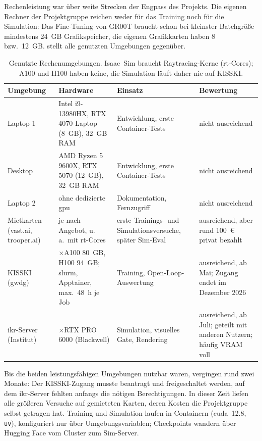 Rechenleistung war über weite Strecken der Engpass des Projekts. Die eigenen Rechner der
Projektgruppe reichen weder für das Training noch für die Simulation: Das Fine-Tuning von
GR00T braucht schon bei kleinster Batchgröße mindestens 24~GB Grafikspeicher, die eigenen
Grafikkarten haben 8 bzw.\ 12~GB.  stellt alle genutzten Umgebungen
gegenüber.

\begin{table}[htb]
  \centering
  \small
  \begin{tabularx}{\linewidth}{>{\raggedright\arraybackslash}p{2.6cm}>{\raggedright\arraybackslash}X>{\raggedright\arraybackslash}X>{\raggedright\arraybackslash}p{2.4cm}}
    \toprule
    Umgebung & Hardware & Einsatz & Bewertung \\
    \midrule
    Laptop 1 & Intel i9-13980HX, RTX 4070 Laptop (8~GB), 32~GB RAM & Entwicklung, erste
      Container-Tests & nicht ausreichend \\
    Desktop & AMD Ryzen 5 9600X, RTX 5070 (12~GB), 32~GB RAM & Entwicklung, erste
      Container-Tests & nicht ausreichend \\
    Laptop 2 & ohne dedizierte \acs{gpu} & Dokumentation, Fernzugriff & nicht ausreichend \\
    \addlinespace
    Mietkarten (vast.ai, trooper.ai) & je nach Angebot, u.\,a.\ mit \acs{rt}-Cores &
      erste Trainings- und Simulationsversuche, später Sim-Eval & ausreichend, aber rund
      100~€ privat bezahlt \\
    KISSKI (\acs{gwdg})~\cite{kisski} & 4$\times$A100 80~GB, H100 94~GB; \acs{slurm},
      Apptainer, max.\ 48~h je Job & Training, Open-Loop-Auswertung & ausreichend, ab Mai;
      Zugang endet im Dezember 2026 \\
    \acs{ikr}-Server (Institut) & 2$\times$RTX PRO 6000 (Blackwell) & Simulation, visuelles
      Gate, Rendering & ausreichend, ab Juli; geteilt mit anderen Nutzern; häufig VRAM voll \\
    \bottomrule
  \end{tabularx}
  \caption[Rechenumgebungen]{Genutzte Rechenumgebungen. Isaac~Sim braucht Raytracing-Kerne
    (\acs{rt}-Cores); A100 und H100 haben keine, die Simulation läuft daher nie auf KISSKI.}
  \label{tab:rechenumgebungen}
\end{table}

Bis die beiden leistungsfähigen Umgebungen nutzbar waren, vergingen rund zwei Monate: Der
KISSKI-Zugang musste beantragt und freigeschaltet werden, auf dem \acs{ikr}-Server fehlten
anfangs die nötigen Berechtigungen. In dieser Zeit liefen alle größeren Versuche auf
gemieteten Karten, deren Kosten die Projektgruppe selbst getragen hat. Training und Simulation
laufen in Containern (\acs{cuda}~12.8, \texttt{uv}), konfiguriert nur über
Umgebungsvariablen; Checkpoints wandern über Hugging Face vom Cluster zum Sim-Server.

